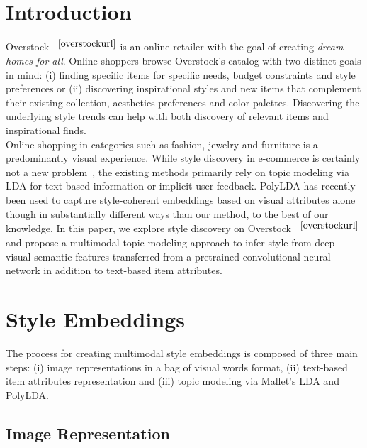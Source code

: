 \documentclass[10pt,twocolumn,letterpaper]{article}
\renewcommand{\footref}[1]{%
    $^{\ref{#1}}$%
}
\begin{document}
\section{Introduction}
Overstock~\footref{overstockurl} is an online retailer with the goal of creating \textit{dream homes for all}. Online shoppers browse Overstock's catalog with two distinct goals in mind: (i) finding specific items for specific needs, budget constraints and style preferences or (ii) discovering inspirational styles and new items that complement their existing collection, aesthetics preferences and color palettes. Discovering the underlying style trends can help with both discovery of relevant items and inspirational finds.\\
Online shopping in categories such as fashion, jewelry and furniture is a predominantly visual experience. While style discovery in e-commerce is certainly not a new problem~\cite{hu2014style}, the existing methods primarily rely on topic modeling via LDA for text-based information or implicit user feedback. PolyLDA has recently been used to capture style-coherent embeddings based on visual attributes alone~\cite{hsiao2017learning} though in substantially different ways than our method, to the best of our knowledge. In this paper, we explore style discovery on Overstock~\footref{overstockurl} and propose a multimodal topic modeling approach to infer style from deep visual semantic features transferred from a pretrained convolutional neural network in addition to text-based item attributes.

\section{Style Embeddings}
\label{sec:method}
The process for creating multimodal style embeddings is composed of three main steps: (i) image representations in a bag of visual words format, (ii) text-based item attributes representation and (iii) topic modeling via Mallet's LDA and PolyLDA.

\subsection{Image Representation}
\label{Image Representation}
\end{document}
